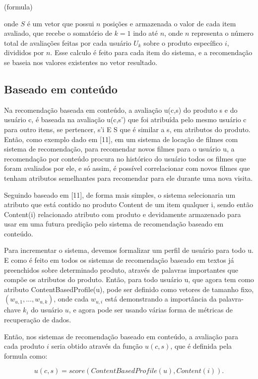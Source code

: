 \documentclass[12pt,
				openright,
				twoside,
				a4paper,
				apter=TITLE,
				section=TITLE,
				subsection=TITLE,
				chapter=TITLE,
				english,
				brazil]{abntex2}
\begin{document}
(formula)

onde $S$ é um vetor que possui $n$ posições e armazenada o valor de cada item avaliado, que recebe o somatório de $k = 1$ indo até $n$, onde $n$ representa o número total de avaliações feitas por cada usuário $U_{k}$ sobre o produto específico $i$, divididos por $n$. Esse calculo é feito para cada item do sistema, e a recomendação se baseia nos valores existentes no vetor resultado.


\subsection{Baseado em conteúdo}
Na recomendação baseada em conteúdo, a avaliação u(c,s) do produto s e do usuário c, é baseada na avaliação u(c,s') que foi atribuída pelo mesmo usuário c para outro itens, se pertencer, s'i E S que é similar a s, em atributos do produto. Então, como exemplo dado em [11], em um sistema de locação de filmes com sistema de recomendação, para recomendar novos filmes para o usuário u, a recomendação por conteúdo procura no histórico do usuário todos os filmes que foram avaliados por ele, e só assim, é possível correlacionar com novos filmes que tenham atributos semelhantes para recomendar para ele durante uma nova visita.

Seguindo baseado em [11], de forma mais simples, o sistema selecionaria um atributo que está contido no produto Content de um item qualquer i, sendo então Content(i) relacionado atributo com produto e devidamente armazenado para usar em uma futura predição pelo sistema de recomendação baseado em conteúdo.

Para incrementar o sistema, devemos formalizar um perfil de usuário para todo u. E como é feito em todos os sistemas de recomendação baseado em textos já preenchidos sobre determinado produto, através de palavras importantes que compõe os atributos do produto. Então, para todo usuário u, que agora tem como atributo ContentBasedProfile(u), pode ser definido
como vetores de tamanho fixo, $(w_{u,1}, ... , w_{u,k})$, onde cada $w_{u,i}$ está demonstrando a importância da palavra-chave $k_i$ do usuário $u$, e agora pode ser usando várias forma de métricas de recuperação de dados. 

Então, nos sistemas de recomendação baseado em conteúdo, a avaliação para cada produto $i$ seria obtido através da função $u(c,s)$, que é definida pela formula como: 

\begin{equation}
 u(c,s) = score(ContentBasedProfile(u),Content(i)).
\end{equation}
\end{document}
